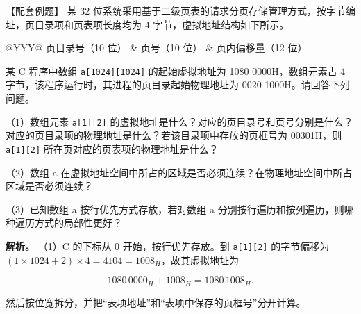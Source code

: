 \begin{example}[配套例题]

【配套例题】 某 32 位系统采用基于二级页表的请求分页存储管理方式，按字节编址，页目录项和页表项长度均为 4 字节，虚拟地址结构如下所示。

\begin{wideblock}

\par\medskip\noindent\begin{minipage}{\linewidth}\fontsize{9.3}{12}\selectfont\begin{tabularx}{\linewidth}{@{}YYY@{}}
\toprule\noalign{}
页目录号（10 位） & 页号（10 位） & 页内偏移量（12 位） \\
\midrule\noalign{}


\bottomrule\end{tabularx}
\end{minipage}\par\medskip

\end{wideblock}

某 C 程序中数组 \texttt{a[\allowbreak{}1024]\allowbreak{}[\allowbreak{}1024]\allowbreak{}} 的起始虚拟地址为 1080 0000H，数组元素占 4 字节，该程序运行时，其进程的页目录起始物理地址为 0020 1000H。请回答下列问题。

（1）数组元素 \texttt{a[\allowbreak{}1]\allowbreak{}[\allowbreak{}2]\allowbreak{}} 的虚拟地址是什么？对应的页目录号和页号分别是什么？对应的页目录项的物理地址是什么？若该目录项中存放的页框号为 00301H，则 \texttt{a[\allowbreak{}1]\allowbreak{}[\allowbreak{}2]\allowbreak{}} 所在页对应的页表项的物理地址是什么？

（2）数组 a 在虚拟地址空间中所占的区域是否必须连续？在物理地址空间中所占区域是否必须连续？

（3）已知数组 a 按行优先方式存放，若对数组 a 分别按行遍历和按列遍历，则哪种遍历方式的局部性更好？

\end{example}

\textbf{解析。} （1）C 的下标从 0 开始，按行优先存放。到 \texttt{a[\allowbreak{}1]\allowbreak{}[\allowbreak{}2]\allowbreak{}} 的字节偏移为 \((1\times1024+2)\times4=4104=1008_H\)，故其虚拟地址为

\[1080\,0000_H+1008_H=1080\,1008_H.\]

然后按位宽拆分，并把``表项地址''和``表项中保存的页框号''分开计算。

